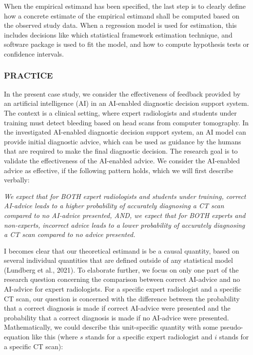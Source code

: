 \documentclass[
  man,floatsintext]{apa6}
\begin{document}
When the empirical estimand has been specified, the last step is to clearly define how a concrete estimate of the empirical estimand shall be computed based on the observed study data.
When a regression model is used for estimation, this includes decisions like which statistical framework estimation technique, and software package is used to fit the model, and how to compute hypothesis tests or confidence intervals.

\hypertarget{practice}{%
\subsubsection{PRACTICE}\label{practice}}

In the present case study, we consider the effectiveness of feedback provided by an artificial intelligence (AI) in an AI-enabled diagnostic decision support system.
The context is a clinical setting, where expert radiologists and students under training must detect bleeding based on head scans from computer tomography.
In the investigated AI-enabled diagnostic decision support system, an AI model can provide initial diagnostic advice, which can be used as guidance by the humans that are required to make the final diagnostic decision.
The research goal is to validate the effectiveness of the AI-enabled advice.
We consider the AI-enabled advice as effective, if the following pattern holds, which we will first describe verbally:

\emph{We expect that for BOTH expert radiologists and students under training, correct AI-advice leads to a higher probability of accurately diagnosing a CT scan compared to no AI-advice presented, AND, we expect that for BOTH experts and non-experts, incorrect advice leads to a lower probability of accurately diagnosing a CT scan compared to no advice presented.}

I becomes clear that our theoretical estimand is be a causal quantity, based on several individual quantities that are defined outside of any statistical model (Lundberg et al., 2021).
To elaborate further, we focus on only one part of the research question concerning the comparison between correct AI-advice and no AI-advice for expert radiologists.
For a specific expert radiologist and a specific CT scan, our question is concerned with the difference between the probability that a correct diagnosis is made if correct AI-advice were presented and the probability that a correct diagnosis is made if no AI-advice were presented.
Mathematically, we could describe this unit-specific quantity with some pseudo-equation like this (where \(s\) stands for a specific expert radiologist and \(i\) stands for a specific CT scan):
\end{document}
